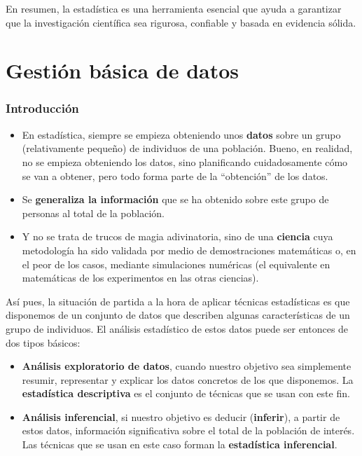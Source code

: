 \documentclass[
  letterpaper,
  DIV=11,
  numbers=noendperiod]{scrreprt}
\begin{document}
En resumen, la estadística es una herramienta esencial que ayuda a
garantizar que la investigación científica sea rigurosa, confiable y
basada en evidencia sólida.

\hypertarget{gestiuxf3n-buxe1sica-de-datos}{%
\section{Gestión básica de datos}\label{gestiuxf3n-buxe1sica-de-datos}}

\hypertarget{introducciuxf3n}{%
\subsubsection{Introducción}\label{introducciuxf3n}}

\begin{itemize}
\item
  En estadística, siempre se empieza obteniendo unos \textbf{datos}
  sobre un grupo (relativamente pequeño) de individuos de una población.
  Bueno, en realidad, no se empieza obteniendo los datos, sino
  planificando cuidadosamente cómo se van a obtener, pero todo forma
  parte de la ``obtención'' de los datos.
\item
  Se \textbf{generaliza la información} que se ha obtenido sobre este
  grupo de personas al total de la población.
\item
  Y no se trata de trucos de magia adivinatoria, sino de una
  \textbf{ciencia} cuya metodología ha sido validada por medio de
  demostraciones matemáticas o, en el peor de los casos, mediante
  simulaciones numéricas (el equivalente en matemáticas de los
  experimentos en las otras ciencias).
\end{itemize}

Así pues, la situación de partida a la hora de aplicar técnicas
estadísticas es que disponemos de un conjunto de datos que describen
algunas características de un grupo de individuos. El análisis
estadístico de estos datos puede ser entonces de dos tipos básicos:

\begin{itemize}
\item
  \textbf{Análisis exploratorio de datos}, cuando nuestro objetivo sea
  simplemente resumir, representar y explicar los datos concretos de los
  que disponemos. La \textbf{estadística descriptiva} es el conjunto de
  técnicas que se usan con este fin.
\item
  \textbf{Análisis inferencial}, si nuestro objetivo es deducir
  (\textbf{inferir}), a partir de estos datos, información significativa
  sobre el total de la población de interés. Las técnicas que se usan en
  este caso forman la \textbf{estadística inferencial}.
\end{itemize}
\end{document}
